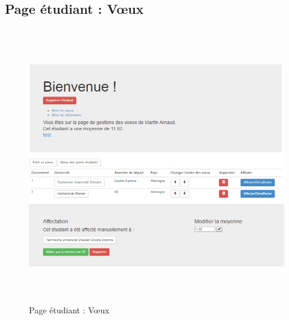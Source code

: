          \subsection{Page étudiant : Vœux}
         \label{ev}
         \begin{figure}[H]
         	\centering
         	\includegraphics[width=16cm,height=12cm]{Images/Admin/page_etud_admin.png}
         	\caption{Page étudiant : Vœux}
         	
         \end{figure}
         
    

